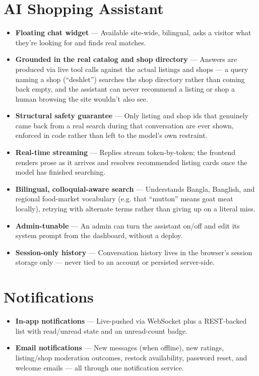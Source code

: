 \documentclass[11pt]{article}
\newcommand{\feature}[2]{%
  \item \textbf{#1} --- #2
}
\begin{document}
\section{AI Shopping Assistant}
\begin{itemize}
  \feature{Floating chat widget}{Available site-wide, bilingual, asks a visitor what they're looking for and finds real matches.}
  \feature{Grounded in the real catalog and shop directory}{Answers are produced via live tool calls against the actual listings and shops --- a query naming a shop (``deshlet'') searches the shop directory rather than coming back empty, and the assistant can never recommend a listing or shop a human browsing the site wouldn't also see.}
  \feature{Structural safety guarantee}{Only listing and shop ids that genuinely came back from a real search during that conversation are ever shown, enforced in code rather than left to the model's own restraint.}
  \feature{Real-time streaming}{Replies stream token-by-token; the frontend renders prose as it arrives and resolves recommended listing cards once the model has finished searching.}
  \feature{Bilingual, colloquial-aware search}{Understands Bangla, Banglish, and regional food-market vocabulary (e.g. that ``mutton'' means goat meat locally), retrying with alternate terms rather than giving up on a literal miss.}
  \feature{Admin-tunable}{An admin can turn the assistant on/off and edit its system prompt from the dashboard, without a deploy.}
  \feature{Session-only history}{Conversation history lives in the browser's session storage only --- never tied to an account or persisted server-side.}
\end{itemize}

\section{Notifications}
\begin{itemize}
  \feature{In-app notifications}{Live-pushed via WebSocket plus a REST-backed list with read/unread state and an unread-count badge.}
  \feature{Email notifications}{New messages (when offline), new ratings, listing/shop moderation outcomes, restock availability, password reset, and welcome emails --- all through one notification service.}
\end{itemize}
\end{document}
